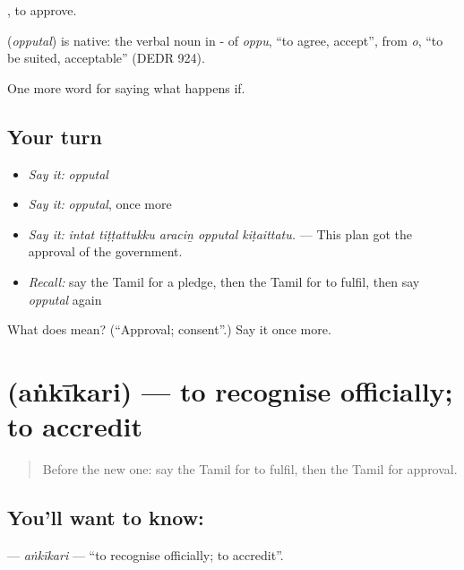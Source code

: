  , to approve.

\begin{cousinweb}
\textbf{} (\emph{opputal}) is native: the verbal noun in - of \emph{oppu}, \textquotedblleft{}to agree, accept\textquotedblright{}, from \emph{o}, \textquotedblleft{}to be suited, acceptable\textquotedblright{} (DEDR 924).
\end{cousinweb}

\begin{grammarlens}[title={What you've built}]
One more word for saying what happens if.
\end{grammarlens}

\subsection*{Your turn}
\begin{itemize}
\raggedright
  \item \emph{Say it:} \emph{opputal}
  \item \emph{Say it:} \emph{opputal}, once more
  \item \emph{Say it:} \emph{intat tiṭṭattukku araciṉ opputal kiṭaittatu.} — This plan got the approval of the government.
  \item \emph{Recall:} say the Tamil for a pledge, then the Tamil for to fulfil, then say \emph{opputal} again
\end{itemize}

\begin{tcolorbox}[breakable,colback=teal!4,colframe=teal!35!black,title={Before you move on}]
What does  mean? (\textquotedblleft{}Approval; consent\textquotedblright{}.) Say it once more.
\end{tcolorbox}
\section[\texorpdfstring{\ta{அங்கீகரி} (aṅkīkari)}{அங்கீகரி (aṅkīkari)}]{ (aṅkīkari) — to recognise officially; to accredit}

\label{lesson:TA-C388-ankikari}



\begin{quote}
Before the new one: say the Tamil for to fulfil, then the Tamil for approval.
\end{quote}

\subsection*{You'll want to know: }
\textbf{} — \emph{aṅkīkari} — \textquotedblleft{}to recognise officially; to accredit\textquotedblright{}.

